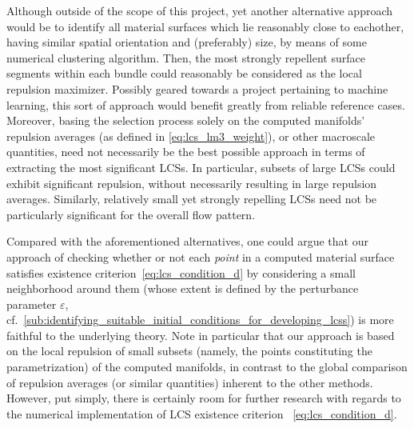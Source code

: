 Although outside of the scope of this project, yet another alternative
approach would be to identify all material surfaces which lie reasonably close
to eachother, having similar spatial orientation and (preferably) size, by
means of some numerical clustering algorithm. Then, the most strongly repellent
surface segments within each bundle could reasonably be considered as the local
repulsion maximizer. Possibly geared towards a project pertaining to machine
learning, this sort of approach would benefit greatly from reliable reference
cases. Moreover, basing the selection process solely on the computed manifolds'
repulsion averages (as defined in \cref{eq:lcs_lm3_weight}), or other
macroscale quantities, need not necessarily be the best possible approach in
terms of extracting the most significant LCSs. In particular, subsets of large
LCSs could exhibit significant repulsion, without necessarily resulting in large
repulsion averages. Similarly, relatively small yet strongly repelling LCSs
need not be particularly significant for the overall flow pattern.

Compared with the aforementioned alternatives, one could argue that our
approach of checking whether or not each \emph{point} in a computed material
surface satisfies existence criterion~\eqref{eq:lcs_condition_d} by considering
a small neighborhood around them (whose extent is defined by the perturbance
parameter $\varepsilon$, cf.\
\cref{sub:identifying_suitable_initial_conditions_for_developing_lcss}) is more
faithful to the underlying theory. Note in particular that our approach is
based on the local repulsion of small subsets (namely, the points constituting
the parametrization) of the computed manifolds, in contrast to the global
comparison of repulsion averages (or similar quantities) inherent to the other
methods. However, put simply, there is certainly room for further research with
regards to the numerical implementation of LCS existence criterion~%
\eqref{eq:lcs_condition_d}.
